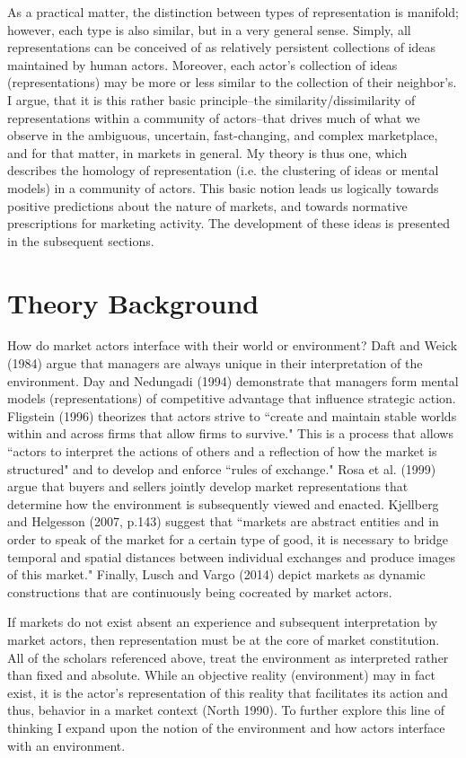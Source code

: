 As a practical matter, the distinction between types of representation is manifold; however, each type is also similar, but in a very general sense. Simply, all representations can be conceived of as relatively persistent collections of ideas maintained by human actors. Moreover, each actor's collection of ideas (representations) may be more or less similar to the collection of their neighbor's. I argue, that it is this rather basic principle--the similarity/dissimilarity of representations within a community of actors--that drives much of what we observe in the ambiguous, uncertain, fast-changing, and complex marketplace, and for that matter, in markets in general. My theory is thus one, which describes the homology of representation (i.e. the clustering of ideas or mental models) in a community of actors. This basic notion leads us logically towards positive predictions about the nature of markets, and towards normative prescriptions for marketing activity. The development of these ideas is presented in the subsequent sections.

\section{Theory Background}

How do market actors interface with their world or environment? Daft and Weick (1984) argue that managers are always unique in their interpretation of the environment. Day and Nedungadi (1994) demonstrate that managers form mental models (representations) of competitive advantage that influence strategic action. Fligstein (1996) theorizes that actors strive to ``create and maintain stable worlds within and across firms that allow firms to survive." This is a process that allows ``actors to interpret the actions of others and a reflection of how the market is structured" and to develop and enforce ``rules of exchange."  Rosa et al. (1999) argue that buyers and sellers jointly develop market representations that determine how the environment is subsequently viewed and enacted. Kjellberg and Helgesson (2007, p.143) suggest that ``markets are abstract entities and in order to speak of the market for a certain type of good, it is necessary to bridge temporal and spatial distances between individual exchanges and produce images of this market." Finally, Lusch and Vargo (2014) depict markets as dynamic constructions that are continuously being cocreated by market actors. 

If markets do not exist absent an experience and subsequent interpretation by market actors, then representation must be at the core of market constitution. All of the scholars referenced above, treat the environment as interpreted rather than fixed and absolute. While an objective reality (environment) may in fact exist, it is the actor's representation of this reality that facilitates its action and thus, behavior in a market context (North 1990). To further explore this line of thinking I expand upon the notion of the environment and how actors interface with an environment. 


